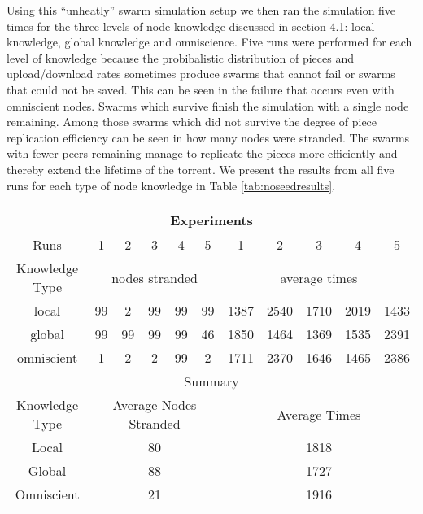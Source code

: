 Using this ``unheatly'' swarm simulation setup we then ran the
simulation five times for the three levels of node knowledge discussed
in section 4.1: local knowledge, global knowledge and
omniscience. Five runs were performed for each level of knowledge
because the probibalistic distribution of pieces and upload/download
rates sometimes produce swarms that cannot fail or swarms that
could not be saved. This can be seen in the failure that occurs even
with omniscient nodes. Swarms which survive finish the simulation
with a single node remaining. Among those swarms which did not survive
the degree of piece replication efficiency can be seen in how many
nodes were stranded. The swarms with fewer peers remaining manage to
replicate the pieces more efficiently and thereby extend the
lifetime of the torrent. We present the results from all five runs for each type
of node knowledge in Table \ref{tab:noseedresults}.

\begin{table*}
\centering
\caption{Swarms with No Seeds Results}
\begin{tabular}{|c|c|c|c|c|c|c|c|c|c|c|} \hline
\multicolumn{11}{|c|}{Experiments}\\ \hline
Runs & 1 & 2 & 3 & 4 & 5 & 1 & 2 & 3 & 4 & 5\\ \hline
Knowledge Type & \multicolumn{5}{c|}{nodes stranded} & \multicolumn{5}{c|}{average times}\\ \hline
local      & 99&  2& 99& 99& 99&1387&2540&1710&2019&1433\\
global     & 99& 99& 99& 99& 46&1850&1464&1369&1535&2391\\
omniscient &  1&  2&  2& 99&  2&1711&2370&1646&1465&2386\\ \hline \hline
\multicolumn{11}{|c|}{Summary}\\ \hline
Knowledge Type & \multicolumn{5}{c|}{Average Nodes Stranded} & \multicolumn{5}{c|}{Average Times}\\ \hline
Local & \multicolumn{5}{c|}{80} & \multicolumn{5}{c|}{1818}\\
Global & \multicolumn{5}{c|}{88} & \multicolumn{5}{c|}{1727}\\
Omniscient & \multicolumn{5}{c|}{21} & \multicolumn{5}{c|}{1916}\\
\hline\end{tabular}
\label{tab:noseedresults}
\end{table*}


